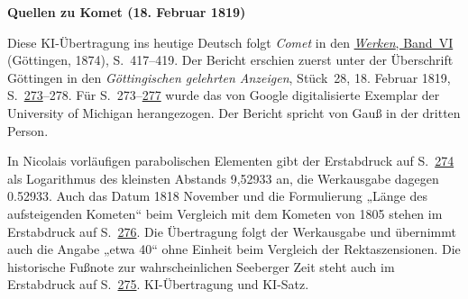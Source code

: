 \clearpage\thispagestyle{empty}
\begin{center}\textbf{Quellen zu Komet (18. Februar 1819)}\end{center}
\noindent Diese KI-Übertragung ins heutige Deutsch folgt \textit{Comet} in den \href{https://gdz.sub.uni-goettingen.de/id/PPN236007467}{\textit{Werken}, Band~VI} (Göttingen, 1874), S.~417--419. Der Bericht erschien zuerst unter der Überschrift Göttingen in den \textit{Göttingischen gelehrten Anzeigen}, Stück~28, 18. Februar 1819, S.~\href{https://books.google.com/books?id=CAQEAAAAMAAJ&pg=PA273}{273}--278. Für S.~273--\href{https://books.google.com/books?id=CAQEAAAAMAAJ&pg=PA277}{277} wurde das von Google digitalisierte Exemplar der University of Michigan herangezogen. Der Bericht spricht von Gauß in der dritten Person.
\par\smallskip\noindent In Nicolais vorläufigen parabolischen Elementen gibt der Erstabdruck auf S.~\href{https://books.google.com/books?id=CAQEAAAAMAAJ&pg=PA274}{274} als Logarithmus des kleinsten Abstands 9,52933 an, die Werkausgabe dagegen 0.52933. Auch das Datum 1818 November und die Formulierung „Länge des aufsteigenden Kometen“ beim Vergleich mit dem Kometen von 1805 stehen im Erstabdruck auf S.~\href{https://books.google.com/books?id=CAQEAAAAMAAJ&pg=PA276}{276}. Die Übertragung folgt der Werkausgabe und übernimmt auch die Angabe „etwa 40“ ohne Einheit beim Vergleich der Rektaszensionen. Die historische Fußnote zur wahrscheinlichen Seeberger Zeit steht auch im Erstabdruck auf S.~\href{https://books.google.com/books?id=CAQEAAAAMAAJ&pg=PA275}{275}. KI-Übertragung und KI-Satz.
\clearpage
